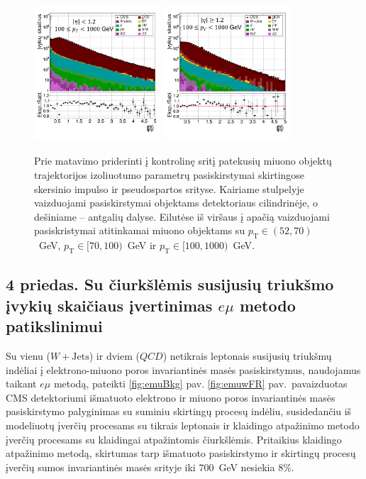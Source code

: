 \documentclass[a4paper, 12pt, oneside]{article}
\newcommand{\pT}{p_{\mathrm{T}}}
\newcommand{\emu}{e\mu}
\newcommand{\WJets}{W\! +\!\mathrm{Jets}}
\newcommand{\QCD}{QC\! D}
\begin{document}
\vspace{-1cm}
\begin{figure}[H]
	\includegraphics[width=0.42\textwidth]{Magistrinis/TFIT_ctrl_barrel_100to1000.png}
	\includegraphics[width=0.42\textwidth]{Magistrinis/TFIT_ctrl_endcap_100to1000.png}
	\vspace{-0.7cm}
	\caption{\label{fig:tFit_control}Prie matavimo priderinti į kontrolinę sritį patekusių miuono objektų trajektorijos izoliuotumo
	parametrų pasiskirstymai skirtingose skersinio impulso ir pseudospartos srityse.
	Kairiame stulpelyje vaizduojami pasiskirstymai objektams detektoriaus cilindrinėje, o dešiniame -- antgalių dalyse.
	Eilutėse iš viršaus į apačią vaizduojami pasiskristymai atitinkamai miuono objektams su $\pT\!\in\!(52,70)$~GeV,
	$\pT\!\in\![70,100)$~GeV ir $\pT\!\in\![100,1000)$~GeV.}
\end{figure}


\subsection*{4 priedas. Su čiurkšlėmis susijusių triukšmo įvykių skaičiaus įvertinimas $\emu$ metodo patikslinimui}
Su vienu ($\WJets$) ir dviem ($\QCD$) netikrais leptonais susijusių triukšmų indėliai į elektrono-miuono
poros invariantinės masės pasiskirstymus, naudojamus taikant $\emu$ metodą, pateikti \ref{fig:emuBkg} pav.
\ref{fig:emuwFR} pav.\ pavaizduotas CMS detektoriumi išmatuoto elektrono ir miuono poros invariantinės masės pasiskirstymo
palyginimas su suminiu skirtingų procesų indėliu, susidedančiu iš modeliuotų įverčių procesams su tikrais leptonais ir 
klaidingo atpažinimo metodo įverčių procesams su klaidingai atpažintomis čiurkšlėmis.
Pritaikius klaidingo atpažinimo metodą, skirtumas tarp išmatuoto pasiskirstymo ir skirtingų procesų įverčių sumos invariantinės
masės srityje iki $700$~GeV nesiekia $8\%$.
\end{document}
